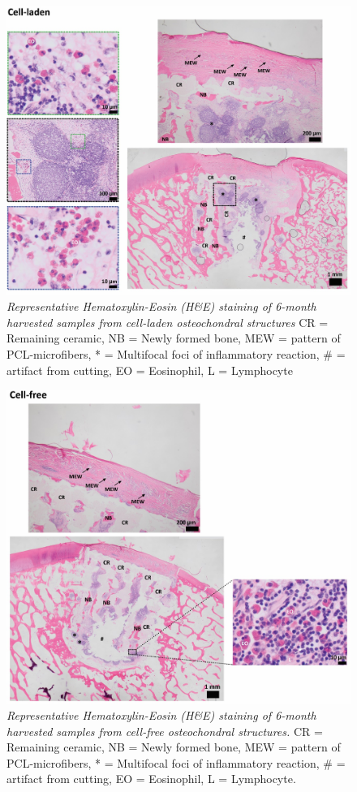 \documentclass[twocolumn, serif, empirical, authordate, seplic]{jote-article}
\begin{document}
\begin{figure}
\centering \includegraphics[width=1.02\columnwidth]{articles/empirical/horse/media/image17.jpg}
\caption{\emph{Representative Hematoxylin-Eosin (H\&E) staining of 6-month harvested samples from cell-laden osteochondral structures}  CR = Remaining ceramic, NB = Newly formed bone, MEW = pattern of PCL-microfibers, * = Multifocal foci of inflammatory reaction, \# = artifact from cutting, EO = Eosinophil, L = Lymphocyte}
\label{fig:sup6}\end{figure}


\begin{figure}
\centering \includegraphics[width=\columnwidth]{articles/empirical/horse/media/image18.jpg}
\caption{\emph{Representative Hematoxylin-Eosin (H\&E) staining of 6-month harvested samples from cell-free osteochondral structures.}  CR = Remaining ceramic, NB = Newly formed bone, MEW = pattern of PCL-microfibers, * = Multifocal foci of inflammatory reaction, \# = artifact from cutting, EO = Eosinophil, L = Lymphocyte.}
\label{fig:sup7}\end{figure}
\end{document}
